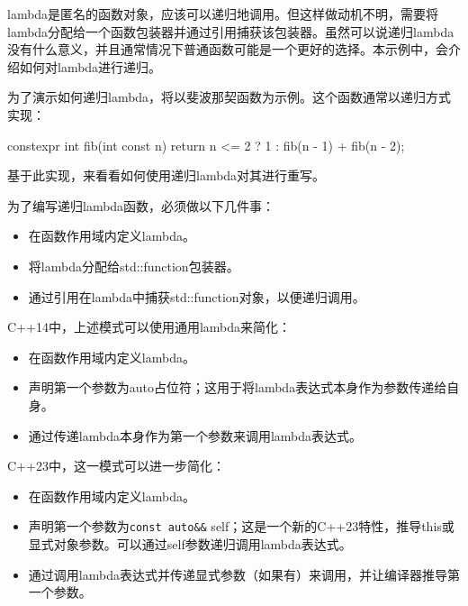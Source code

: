 lambda是匿名的函数对象，应该可以递归地调用。但这样做动机不明，需要将lambda分配给一个函数包装器并通过引用捕获该包装器。虽然可以说递归lambda没有什么意义，并且通常情况下普通函数可能是一个更好的选择。本示例中，会介绍如何对lambda进行递归。


为了演示如何递归lambda，将以斐波那契函数为示例。这个函数通常以递归方式实现：

\begin{cpp}
constexpr int fib(int const n)
{
    return n <= 2 ? 1 : fib(n - 1) + fib(n - 2);
}
\end{cpp}

基于此实现，来看看如何使用递归lambda对其进行重写。


为了编写递归lambda函数，必须做以下几件事：

\begin{itemize}
\item
在函数作用域内定义lambda。

\item
将lambda分配给std::function包装器。

\item
通过引用在lambda中捕获std::function对象，以便递归调用。
\end{itemize}

C++14中，上述模式可以使用通用lambda来简化：

\begin{itemize}
\item
在函数作用域内定义lambda。

\item
声明第一个参数为auto占位符；这用于将lambda表达式本身作为参数传递给自身。

\item
通过传递lambda本身作为第一个参数来调用lambda表达式。
\end{itemize}

C++23中，这一模式可以进一步简化：

\begin{itemize}
\item
在函数作用域内定义lambda。

\item
声明第一个参数为\verb|const auto&&| self；这是一个新的C++23特性，推导this或显式对象参数。可以通过self参数递归调用lambda表达式。

\item
通过调用lambda表达式并传递显式参数（如果有）来调用，并让编译器推导第一个参数。
\end{itemize}

